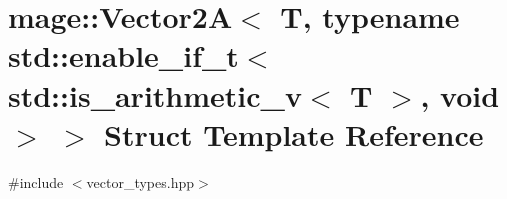 \hypertarget{structmage_1_1_vector2_a_3_01_t_00_01typename_01std_1_1enable__if__t_3_01std_1_1is__arithmetic__b421e7a25afc1ac5972d3b452777021a}{}\section{mage\+:\+:Vector2A$<$ T, typename std\+:\+:enable\+\_\+if\+\_\+t$<$ std\+:\+:is\+\_\+arithmetic\+\_\+v$<$ T $>$, void $>$ $>$ Struct Template Reference}
\label{structmage_1_1_vector2_a_3_01_t_00_01typename_01std_1_1enable__if__t_3_01std_1_1is__arithmetic__b421e7a25afc1ac5972d3b452777021a}


{\ttfamily \#include $<$vector\+\_\+types.\+hpp$>$}

